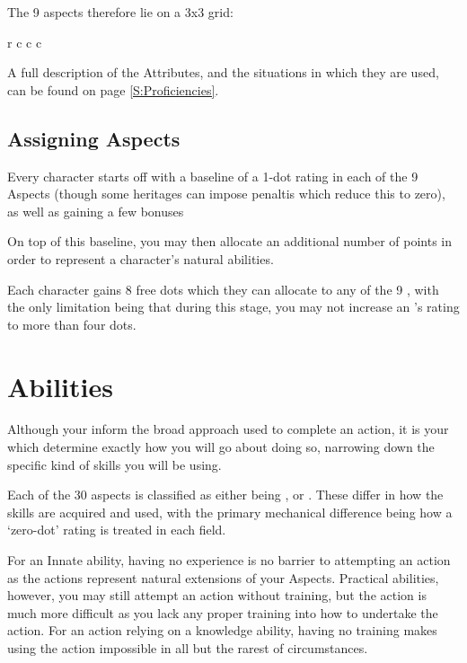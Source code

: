 The 9 aspects therefore lie on a 3x3 grid:

\begin{center}
	\begin{rndtable}{r c c c}
	\end{rndtable}
\end{center}

A full description of the Attributes, and the situations in which they are used, can be found on page \ref{S:Proficiencies}.

\subsection{Assigning Aspects}

Every character starts off with a baseline of a 1-dot rating in each of the 9 Aspects (though some  heritages can impose penaltis which reduce this to zero), as well as gaining a few bonuses 

On top of this baseline, you may then allocate an additional number of points in order to represent a character's natural abilities.

Each character gains 8 free dots which they can allocate to any of the 9 , with the only limitation being that during this stage, you may not increase an 's rating to more than four dots. 



\section{Abilities}

Although your  inform the broad approach used to complete an action, it is your  which determine exactly how you will go about doing so, narrowing down the specific kind of skills you will be using. 

Each of the 30 aspects is classified as either being ,  or . These differ in how the skills are acquired and used, with the primary mechanical difference being how a `zero-dot' rating is treated in each field. 

For an Innate ability, having no experience is no barrier to attempting an action as the actions represent natural extensions of your Aspects. Practical abilities, however, you may still attempt an action without training, but the action is much more difficult as you lack any proper training into how to undertake the action. For an action relying on a knowledge ability, having no training makes using the action impossible in all but the rarest of circumstances.

